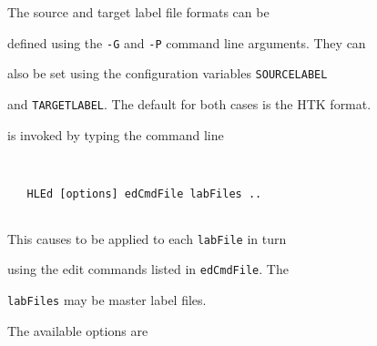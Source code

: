 The source and target label file formats can be 


defined using the \texttt{-G} and \texttt{-P} command line arguments.  They can


also be set using the configuration variables \texttt{SOURCELABEL} 


and \texttt{TARGETLABEL}.  The default for both cases is the HTK format.










 is invoked by typing the command line


\begin{verbatim}


   HLEd [options] edCmdFile labFiles ..


\end{verbatim}


This causes  to be applied to each \texttt{labFile} in turn


using the edit commands listed in \texttt{edCmdFile}.  The 


\texttt{labFiles} may be master label files.


The available options are





